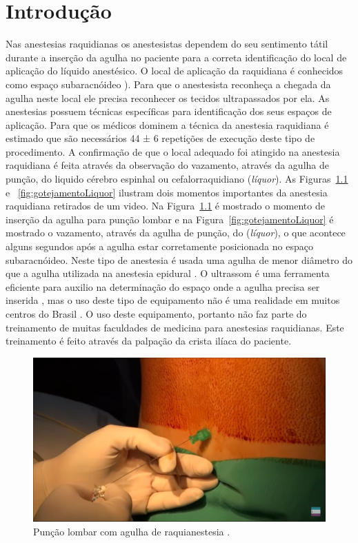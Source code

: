 \chapter{Introdução} \label{cap:cap1}

Nas anestesias raquidianas os anestesistas dependem do seu sentimento tátil durante a inserção da agulha no paciente para a correta identificação do local de aplicação do líquido anestésico. O local de aplicação da raquidiana é conhecidos como espaço subaracnóideo \cite{Miller2009}). Para que o anestesista reconheça a chegada da agulha neste local ele precisa reconhecer os tecidos ultrapassados por ela. As anestesias possuem técnicas específicas para identificação dos seus espaços de aplicação. Para que os médicos dominem a técnica da anestesia raquidiana é estimado que são necessários 44 ± 6 repetições de execução deste tipo de procedimento. A confirmação de que o local adequado foi atingido na anestesia raquidiana é feita através da observação do vazamento, através da agulha de punção, do liquido cérebro espinhal ou cefalorraquidiano (\textit{líquor}). As Figuras~\ref{fig:puncaoLombar} e ~\ref{fig:gotejamentoLiquor}  ilustram dois momentos importantes da anestesia raquidiana retirados de um video. Na Figura~\ref{fig:puncaoLombar} é mostrado o momento de inserção da agulha para punção lombar e na Figura~\ref{fig:gotejamentoLiquor} é mostrado o vazamento, através da agulha de punção, do (\textit{líquor}), o que acontece alguns segundos após a agulha estar corretamente posicionada no espaço subaracnóideo. Neste tipo de anestesia é usada uma agulha de menor diâmetro do que a agulha utilizada na anestesia epidural \cite{Miller2009}. O ultrassom é uma ferramenta eficiente para auxilio na determinação do espaço onde a agulha precisa ser inserida \cite{Helayel2010}, mas o uso deste tipo de equipamento não é uma realidade em muitos centros do Brasil \cite{Hamaji2016}. O uso deste equipamento, portanto não faz parte do treinamento de muitas faculdades de medicina para anestesias raquidianas. Este treinamento é feito através da palpação da crista ilíaca do paciente. 

\begin{figure}[h!]
    \centering
    \includegraphics[scale=0.35,keepaspectratio=true]{figuras/2.PuncaoLombar.png} 
    \caption{Punção lombar com agulha de raquianestesia  \cite{Londero2018}.}
    \label{fig:puncaoLombar}
\end{figure}

